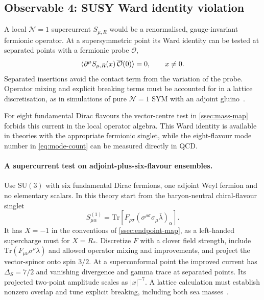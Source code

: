 \documentclass[11pt,a4paper]{article}
\theoremstyle{plain}
\theoremstyle{definition}
\theoremstyle{remark}
\newcommand{\SU}[1]{\mathrm{SU}(#1)}
\newcommand{\Tr}{\mathrm{Tr}}
\begin{document}
\subsection{Observable 4: SUSY Ward identity violation}
\label{ssec:obs4}

A local $\mathcal N=1$ supercurrent $S_{\mu,R}$ would be a
renormalised, gauge-invariant fermionic operator.  At a supersymmetric
point its Ward identity can be tested at separated points with a
fermionic probe $\mathcal O$,
\begin{equation}\label{eq:WI-violation}
  \langle\partial^\mu S_{\mu,R}(x)\,\overline{\cal O}(0)\rangle=0,
  \qquad x\ne0 .
\end{equation}
Separated insertions avoid the contact term from the variation of
the probe.  Operator mixing and explicit breaking terms must be
accounted for in a lattice discretisation, as in simulations of pure
$\mathcal N=1$ SYM with an adjoint gluino~\cite{WardSYM}.

For eight fundamental Dirac flavours the vector-centre test in
\cref{ssec:mass-map} forbids this current in the local operator
algebra.  This Ward identity is available in theories with the
appropriate fermionic singlet, while the eight-flavour mode number in
\cref{eq:mode-count} can be measured directly in QCD.

\paragraph{A supercurrent test on adjoint-plus-six-flavour ensembles.}
Use $\SU{3}$ with six fundamental Dirac fermions, one adjoint Weyl
fermion and no elementary scalars. In this theory start from the
baryon-neutral chiral-flavour singlet
\begin{equation}
 S^{(1)}_{\mu\alpha}
 =\Tr\!\left[F_{\rho\sigma}
       (\sigma^{\rho\sigma}\sigma_\mu\bar\lambda)_\alpha\right] .
\end{equation}
It has $X=-1$ in the conventions of \cref{ssec:endpoint-map}, as a
left-handed supercharge must for $X=R_*$. Discretize $F$ with a
clover field strength, include $\Tr(F_{\mu\nu}\sigma^\nu\bar\lambda)$
and allowed operator mixing and improvements, and project the
vector-spinor onto spin $3/2$. At a superconformal point the improved
current has $\Delta_S=7/2$ and vanishing divergence and gamma trace
at separated points. Its projected two-point amplitude scales as
$|x|^{-7}$. A lattice calculation must establish nonzero overlap
and tune explicit breaking, including both sea masses~\cite{WardSYM}.
\end{document}
